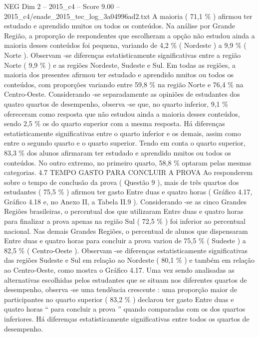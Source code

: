 \begin{textsample}{NEG Dim 2 – 2015\_c4 – Score 9.00 – 2015\_c4/enade\_2015\_tec\_log\_3a04996ad2.txt}
A maioria ( 71,1 \% ) afirmou ter estudado e aprendido muitos ou todos os conteúdos.
Na análise por Grande Região, a proporção de respondentes que escolheram a opção não estudou ainda a maioria desses conteúdos foi pequena, variando de 4,2 \% ( Nordeste ) a 9,9 \% ( Norte ).
Observam -se diferenças estatisticamente significativas entre a região Norte ( 9,9 \% ) e as regiões Nordeste, Sudeste e Sul.
Em todas as regiões, a maioria dos presentes afirmou ter estudado e aprendido muitos ou todos os conteúdos, com proporções variando entre 59,8 \% na região Norte e 76,4 \% na Centro-Oeste.
Considerando -se separadamente as opiniões de estudantes dos quatro quartos de desempenho, observa -se que, no quarto inferior, 9,1 \% ofereceram como resposta que não estudou ainda a maioria desses conteúdos, sendo 2,5 \% os do quarto superior com a mesma resposta.
Há diferenças estatisticamente significativas entre o quarto inferior e os demais, assim como entre o segundo quarto e o quarto superior.
Tendo em conta o quarto superior, 83,3 \% dos alunos afirmaram ter estudado e aprendido muitos ou todos os conteúdos.
No outro extremo, no primeiro quarto, 58,8 \% optaram pelas mesmas categorias. 4.7 TEMPO GASTO PARA CONCLUIR A PROVA Ao responderem sobre o tempo de conclusão da prova ( Questão 9 ), mais de três quartos dos estudantes ( 75,5 \% ) afirmou ter gasto Entre duas e quatro horas ( Gráfico 4.17, Gráfico 4.18 e, no Anexo II, a Tabela II.9 ).
Considerando -se as cinco Grandes Regiões brasileiras, o percentual dos que utilizaram Entre duas e quatro horas para finalizar a prova apenas na região Sul ( 72,5 \% ) foi inferior ao percentual nacional.
Nas demais Grandes Regiões, o percentual de alunos que dispensaram Entre duas e quatro horas para concluir a prova variou de 75,5 \% ( Sudeste ) a 82,5 \% ( Centro-Oeste ).
Observam -se diferenças estatisticamente significativas das regiões Sudeste e Sul em relação ao Nordeste ( 80,1 \% ) e também em relação ao Centro-Oeste, como mostra o Gráfico 4.17.
Uma vez sendo analisadas as alternativas escolhidas pelos estudantes que se situam nos diferentes quartos de desempenho, observa -se uma tendência crescente : uma proporção maior de participantes no quarto superior ( 83,2 \% ) declarou ter gasto Entre duas e quatro horas “ para concluir a prova ” quando comparadas com os dos quartos inferiores.
Há diferenças estatisticamente significativas entre todos os quartos de desempenho.

\end{textsample}
